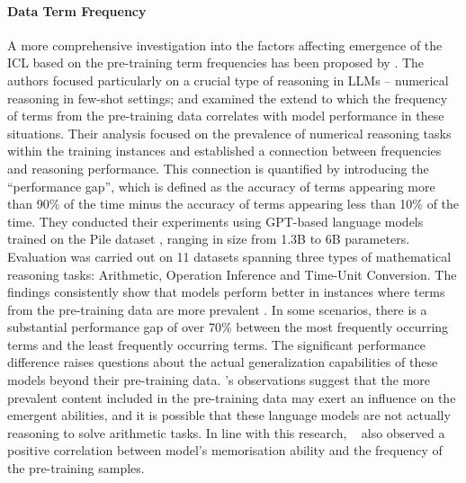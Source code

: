 \paragraph{Data Term Frequency}
A more comprehensive investigation into the factors affecting  emergence of the ICL based on the pre-training term frequencies has been proposed by \citet{Razeghi2022ImpactOP}. 
The authors focused particularly on a crucial type of reasoning in LLMs -- numerical reasoning in few-shot settings; and examined the extend to which the frequency of terms from the pre-training data correlates with model performance in these situations. 
Their analysis focused on the prevalence of numerical reasoning tasks within the training instances and established a connection between frequencies and reasoning performance. This connection is quantified  by introducing the ``performance gap'', which is defined as the accuracy of terms appearing more than 90\% of the time minus the accuracy of terms appearing less than 10\% of the time. They conducted their experiments using GPT-based language models trained on the Pile dataset \citep{Gao2020ThePA}, ranging in size from 1.3B to 6B parameters. Evaluation was carried out on 11 datasets spanning three types of mathematical reasoning tasks: Arithmetic, Operation Inference and Time-Unit Conversion. 
The findings consistently show that models perform better in instances where terms from the pre-training data are more prevalent \citep{Razeghi2022ImpactOP}. 
In some scenarios, there is a substantial performance gap of over 70\% between the most frequently occurring terms and the least frequently occurring terms. 
The significant performance difference raises questions about the actual generalization capabilities of these models beyond their pre-training data. 
\citet{Razeghi2022ImpactOP}'s observations suggest that the more prevalent content included in the pre-training data may exert an influence on the emergent abilities, and it is possible that these language models are not actually reasoning to solve arithmetic tasks. 
In line with this research, ~\citet{Kandpal2022LargeLM} also observed a positive correlation between model's memorisation ability and the frequency of the pre-training samples.
\vspace{-2mm}

